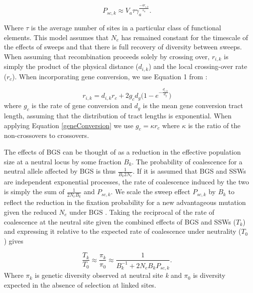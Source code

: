 \begin{equation}
\label{singleClass}
P_{sc,k} \approx V_a \tau\gamma_a^{\frac{-4r_{i,k}}{s_a}}.
\end{equation}

\noindent
Where $\tau$ is the average number of sites in a particular class of functional elements. This model assumes that $N_e$ has remained constant for the timescale of the effects of sweeps and that there is full recovery of diversity between sweeps. When assuming that recombination proceeds solely by crossing over, $r_{i,k}$ is simply the product of the physical distance ($d_{i,k}$) and the local crossing-over rate ($r_c$). When incorporating gene conversion, we use Equation 1 from \cite{RN379}:
 
\begin{equation}
\label{geneConversion}
r_{i,k} = d_{i,k} r_c + 2 g_c d_g \Bigg( 1 - e ^{-\frac{d_{i,k}}{d_g}} \Bigg)
\end{equation} 
\noindent 
where $g_c$ is the rate of gene conversion and $d_g$ is the mean gene conversion tract length, assuming that the distribution of tract lengths is exponential. When applying Equation \ref{geneConversion} we use $g_c = \kappa r_c$ where $\kappa$ is the ratio of the non-crossovers to crossovers.
	

	The effects of BGS can be thought of as a reduction in the effective population size at a neutral locus by some fraction $B_k$. The probability of coalescence for a neutral allele affected by BGS is thus $\frac{1}{B_k 2N_e}$. If it is assumed that BGS and SSWs are independent exponential processes, the rate of coalescence induced by the two is simply the sum of $\frac{1}{2N_e B_k}$ and $P_{sc,k}$. We scale the sweep effect $P_{sc,k}$ by $B_k$ to reflect the reduction in the fixation probability for a new advantageous mutation given the reduced $N_e$ under BGS \citep{RN349}. Taking the reciprocal of the rate of coalescence at the neutral site given the combined effects of BGS and SSWs ($T_k$) and expressing it relative to the expected rate of coalescence under neutrality ($T_0$) gives

\begin{equation}
\label{jointApprox}
\frac{T_k}{T_0} \approx \frac{\pi_{k}}{\pi_{0}} \approx  \frac{1}{B_{k}^{-1}  + 2N_eB_{k}P_{sc,k}}.
\end{equation}
\noindent
	Where $\pi_k$ is genetic diversity observed at neutral site \textit{k} and $\pi_0$ is diversity expected in the absence of selection at linked sites. 
	
